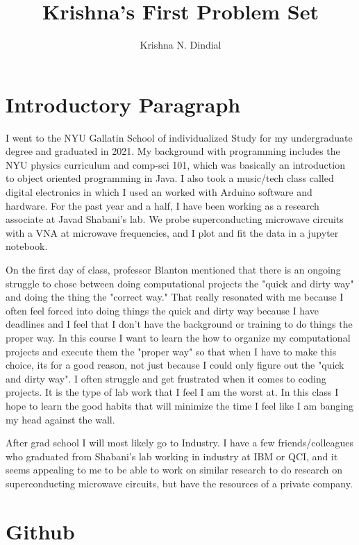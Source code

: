 \documentclass[11pt]{article}
\title{Krishna's First Problem Set}
\author{Krishna N. Dindial}
\begin{document}
\maketitle


\section{Introductory Paragraph}
\label{sec:intro}

I went to the NYU Gallatin School of individualized Study for my undergraduate degree and graduated in 2021. My background with programming includes the NYU physics curriculum and comp-sci 101, which was basically an introduction to object oriented programming in Java. I also took a music/tech class called digital electronics in which I used an worked with Arduino software and hardware. For the past year and a half, I have been working as a research associate at Javad Shabani's lab. We probe superconducting microwave circuits with a VNA at microwave frequencies, and I plot and fit the data in a jupyter notebook.
\par On the first day of class, professor Blanton mentioned that there is an ongoing struggle to chose between doing computational projects the "quick and dirty way" and doing the thing the "correct way." That really resonated with me because I often feel forced into doing things the quick and dirty way because I have deadlines and I feel that I don't have the background or training to do things the proper way. In this course I want to learn the how to organize my computational projects and execute them the "proper way" so that when I have to make this choice, its for a good reason, not just because I could only figure out the "quick and dirty way". I often struggle and get frustrated when it comes to coding projects. It is the type of lab work that I feel I am the worst at. In this class I hope to learn the good habits that will minimize the time I feel like I am banging my head against the wall.
\par After grad school I will most likely go to Industry. I have a few friends/colleagues who graduated from Shabani's lab working in industry at IBM or QCI, and it seems appealing to me to be able to work on similar research to do research on superconducting microwave circuits, but have the resources of a private company.

\section{Github}
\end{document}

